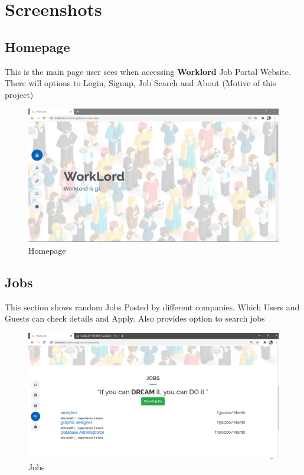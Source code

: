 \documentclass[a4paper,12pt]{report}
\begin{document}
\section{Screenshots}

\subsection {Homepage}
This is the main page user sees when accessing {\bf Worklord} Job Portal Website. There will options to Login, Signup, Job Search and About (Motive of this project)
\begin{figure}[bph]
	\centering
	\includegraphics[width=.7\linewidth ]{img/screenshots/homepage}
	\caption{Homepage}
\end{figure}

\subsection {Jobs}
This section shows random Jobs Posted by different companies. Which Users and Guests can check details and Apply. Also provides option to search jobs
\begin{figure}[bph]
	\centering
	\includegraphics[width=.7\linewidth ]{img/screenshots/jobs}
	\caption{Jobs}
\end{figure}

\pagebreak
\end{document}
